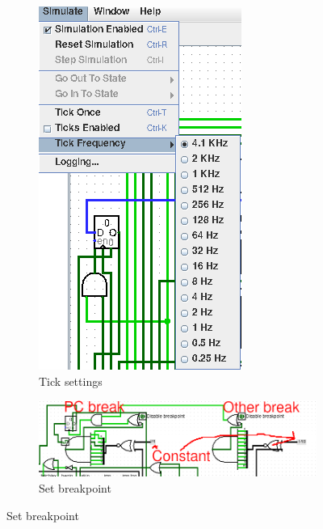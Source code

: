\documentclass{article}
\begin{document}
\begin{figure}[h]
\begin{subfigure}{0.1\textwidth}
		\includegraphics[width=\textwidth]{tick settings.png}
		\caption{Tick settings}
	\end{subfigure}
	\begin{subfigure}{0.6\textwidth}
		\centering
		\includegraphics[width=\textwidth]{break.png}
		\caption{Set breakpoint\label{break}}
	\end{subfigure}
\end{figure}
\end{document}
